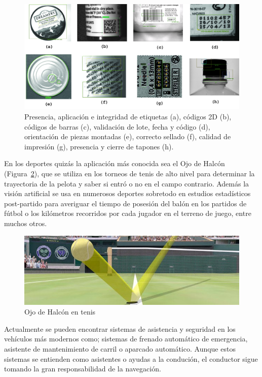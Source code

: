 \begin{figure}[th]
\centering
\includegraphics[scale=0.17]{Figures/industry.png}
\decoRule
\caption[Visión en la industria]{Presencia, aplicación e integridad de etiquetas (a), códigos 2D (b), códigos de barras (c), validación de lote, fecha y código (d), orientación de piezas montadas (e), correcto sellado (f), calidad de impresión (g), presencia y cierre de tapones (h). }
\label{fig:Industry}
\end{figure}

En los deportes quizás la aplicación más conocida sea el Ojo de Halcón (Figura~\ref{fig:Ojohalcon}), que se utiliza en los torneos de tenis de alto nivel para determinar la trayectoria de la pelota y saber si entró o no en el campo contrario. Además la visión artificial se usa en numerosos deportes sobretodo en estudios estadísticos post-partido para averiguar el tiempo de posesión del balón en los partidos de fútbol o los kilómetros recorridos por cada jugador en el terreno de juego, entre muchos otros.

\begin{figure}[th]
\centering
\includegraphics[scale=0.6]{Figures/ojohalcon.jpg}
\decoRule
\caption[Ojo de halcón]{Ojo de Halcón en tenis}
\label{fig:Ojohalcon}
\end{figure}

Actualmente se pueden encontrar sistemas de asistencia y seguridad en los vehículos más modernos como; sistemas de frenado automático de emergencia, asistente de mantenimiento de carril o aparcado automático. Aunque estos sistemas se entienden como asistentes o ayudas a la condución, el conductor sigue tomando la gran responsabilidad de la navegación.

